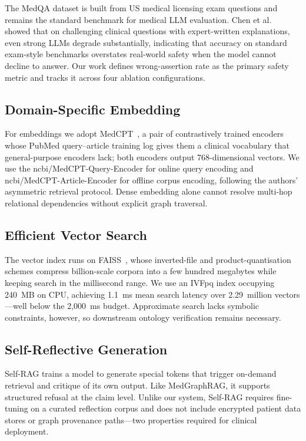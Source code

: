 \documentclass[conference]{IEEEtran}
\begin{document}
The MedQA dataset \cite{jin2021disease} is built from US medical licensing exam
questions and remains the standard benchmark for medical LLM evaluation. Chen et
al.~\cite{chen2024benchmarking} showed that on challenging clinical
questions with expert-written explanations, even strong LLMs degrade
substantially, indicating that accuracy on standard exam-style benchmarks
overstates real-world safety when the model cannot decline to answer. Our
work defines wrong-assertion rate as the primary safety metric and tracks it
across four ablation configurations.

\subsection{Domain-Specific Embedding}

For embeddings we adopt MedCPT~\cite{jin2023medcpt}, a pair of
contrastively trained encoders whose PubMed query--article training log
gives them a clinical vocabulary that general-purpose encoders lack; both
encoders output 768-dimensional vectors. We use the
ncbi/MedCPT-Query-Encoder for online query encoding and
ncbi/MedCPT-Article-Encoder for offline corpus encoding, following the authors'
asymmetric retrieval protocol. Dense embedding alone cannot resolve multi-hop
relational dependencies without explicit graph traversal.

\subsection{Efficient Vector Search}

The vector index runs on FAISS~\cite{johnson2021billion}, whose
inverted-file and product-quantisation schemes compress billion-scale
corpora into a few hundred megabytes while keeping search in the
millisecond range. We use an IVFpq index occupying 240~MB on CPU, achieving
1.1~ms mean search latency over 2.29~million vectors---well below the
2{,}000~ms budget. Approximate search lacks symbolic constraints, however, so
downstream ontology verification remains necessary.

\subsection{Self-Reflective Generation}

Self-RAG \cite{asai2024selfrag} trains a model to generate special tokens that
trigger on-demand retrieval and critique of its own output. Like MedGraphRAG, it
supports structured refusal at the claim level. Unlike our system, Self-RAG
requires fine-tuning on a curated reflection corpus and does not include
encrypted patient data stores or graph provenance paths---two properties
required for clinical deployment.
\end{document}
